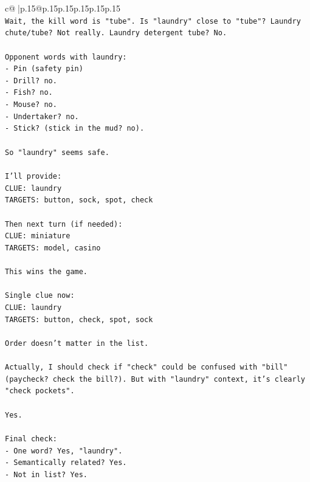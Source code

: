 \documentclass{article}
\begin{document}
{\begin{supertabular}{c@{$\;$}|p{.15\linewidth}@{}p{.15\linewidth}p{.15\linewidth}p{.15\linewidth}p{.15\linewidth}p{.15\linewidth}}
{{{\\ 
\texttt{Wait, the kill word is "tube". Is "laundry" close to "tube"? Laundry chute/tube? Not really. Laundry detergent tube? No.} \\
\\ 
\texttt{Opponent words with laundry:} \\
\texttt{{-} Pin (safety pin)} \\
\texttt{{-} Drill? no.} \\
\texttt{{-} Fish? no.} \\
\texttt{{-} Mouse? no.} \\
\texttt{{-} Undertaker? no.} \\
\texttt{{-} Stick? (stick in the mud? no).} \\
\\ 
\texttt{So "laundry" seems safe.} \\
\\ 
\texttt{I'll provide:} \\
\texttt{CLUE: laundry} \\
\texttt{TARGETS: button, sock, spot, check} \\
\\ 
\texttt{Then next turn (if needed):} \\
\texttt{CLUE: miniature} \\
\texttt{TARGETS: model, casino} \\
\\ 
\texttt{This wins the game.} \\
\\ 
\texttt{Single clue now:} \\
\texttt{CLUE: laundry} \\
\texttt{TARGETS: button, check, spot, sock} \\
\\ 
\texttt{Order doesn't matter in the list.} \\
\\ 
\texttt{Actually, I should check if "check" could be confused with "bill" (paycheck? check the bill?). But with "laundry" context, it's clearly "check pockets".} \\
\\ 
\texttt{Yes.} \\
\\ 
\texttt{Final check:} \\
\texttt{{-} One word? Yes, "laundry".} \\
\texttt{{-} Semantically related? Yes.} \\
\texttt{{-} Not in list? Yes.} \\
}}}
\end{supertabular}}
\end{document}
